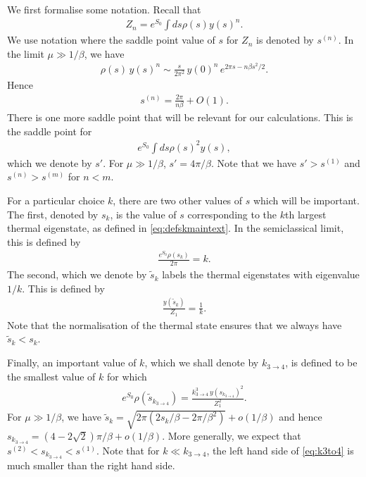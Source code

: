 \documentclass[12pt]{article}
\renewcommand{\tilde}{\widetilde}
\newcommand{\smax}{s_k}
\newcommand{\stilde}{\tilde{s}_k}
\newcommand{\sprime}{s'}
\numberwithin{equation}{section}
\begin{document}
We first formalise some notation. Recall that
\begin{align}
Z_n = e^{S_0} \int ds \rho(s) y (s)^n.
\end{align}
We use notation where the saddle point value of $s$ for $Z_n$ is denoted by $s^{(n)}$.  In the limit $\mu \gg 1/\beta$, we have
\begin{align}
\rho(s)\, y(s)^n \sim \frac{s}{2 \pi^2}\, y(0)^n\, e^{2 \pi s - n\beta s^2/2}.
\end{align}
Hence
\begin{align}
s^{(n)} = \frac{2 \pi}{n\beta} + O(1).
\end{align}
There is one more saddle point that will be relevant for our calculations. This is the saddle point for
\begin{align}
e^{S_0} \int ds \rho(s)^2 y (s),
\end{align}
which we denote by $\sprime$. For $\mu \gg 1/\beta$, $\sprime = 4 \pi /\beta$. Note that we have $\sprime > s^{(1)}$ and $s^{(n)} > s^{(m)}$ for $n < m$.

For a particular choice $k$, there are two other values of $s$ which will be important. The first, denoted by $\smax$, is the value of $s$ corresponding to the $k$th  largest thermal eigenstate, as defined in \eqref{eq:defskmaintext}. In the semiclassical limit, this is defined by 
\begin{align} \label{eq:defsk}
\frac{e^{S_0} \rho(\smax)}{2 \pi} = k.
\end{align} 
The second, which we denote by $\stilde$ labels the thermal eigenstates with eigenvalue $1/k$. This is defined by 
\begin{align}\label{eq:defstildek}
\frac{y(\stilde)}{ Z_1} = \frac{1}{k}.
\end{align}
Note that the normalisation of the thermal state ensures that we always have $\stilde < \smax$. 

Finally, an important value of $k$, which we shall denote by $k_{3 \to 4}$, is defined to be the smallest value of $k$ for which
\begin{align} \label{eq:k3to4}
e^{S_0} \rho(\tilde{s}_{k_{3 \to 4}}) = \frac{k_{3 \to 4}^3 \, y(s_{k_{3\to 4}})^2}{Z_1^2}.
\end{align}
For $\mu \gg 1/\beta$, we have $\stilde = \sqrt{2 \pi (2 \smax/\beta -  2 \pi/\beta^2)} + o(1/\beta)$ and hence $s_{k_{3\to 4}} = (4 - 2\sqrt{2}) \pi/ \beta + o(1/\beta)$. More generally, we expect that $s^{(2)} < s_{k_{3\to 4}} < s^{(1)}$. Note that for $k \ll k_{3 \to 4}$, the left hand side of \eqref{eq:k3to4} is much smaller than the right hand side.
\end{document}

